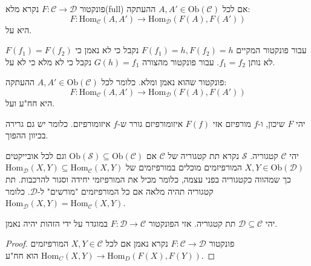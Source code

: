\documentclass{tstextbook}
\begin{document}
\begin{definition}
פונקטור \(F:\mathcal{C}\to \mathcal{D}\) נקרא מלא(full) אם לכל \(A,A' \in \mathrm{Ob}(\mathcal{C})\) ההעתקה:
$$F:\mathrm{Hom}_{\mathcal{C}}(A,A')\to \mathrm{Hom}_{\mathcal{D} }(F(A),F(A'))$$
היא על.

\end{definition}
\begin{example}
\end{example}
עבור פונקטור המקיים \(F(f_{1})=h,F(f_{2})=h\) נקבל כי לא נאמן כי \(F(f_{1})=F(f_{2})\) לא נותן \(f_{1}=f_{2}\). עבור פונקטור מהצורה \(G(h)=f_{1}\) נקבל כי לא מלא כי לא על.

\begin{definition}[שיכון]
פונקטור שהוא נאמן ומלא. כלומר לכל \(A,A' \in \mathrm{Ob}(\mathcal{C})\) ההעתקה:
$$F:\mathrm{Hom}_{\mathcal{C}}(A,A')\to \mathrm{Hom}_{\mathcal{D} }(F(A),F(A'))$$
היא חח"ע ועל.

\end{definition}
\begin{proposition}
יהי \(F\) שיכון, ו-\(f\) מורפיזם אזי \(F(f)\) איזומורפיזם גורר ש-\(f\) איזומורפיזם. כלומר יש גם גרירה בכיוון ההפוך.

\end{proposition}
\begin{reminder}[תת קטגוריה]
יהי \(\mathcal{C}\) קטגוריה. \(\mathcal{S}\) נקרא תת קטגוריה של \(\mathcal{C}\) אם \(\mathrm{Ob}(\mathcal{S})\subseteq \mathrm{Ob}(\mathcal{C})\) וגם לכל אובייקטים \(X,Y \in \mathrm{Ob}(\mathcal{D})\) המורפיזמים מוכלים במורפיזמים של \(\mathrm{Hom}_{\mathcal{D}}(X,Y)\subseteq \mathrm{Hom}_{\mathcal{C}}(X,Y)\) כך שמהווה כקטגוריה בפני עצמה, כלומר מכיל את המורפיזמי יחידה וסגור להרכבות. תת קטגוריה תהיה מלאה אם כל המורפיזמים "מורשים" ל-\(\mathcal{D}\). כלומר \(\mathrm{Hom}_{\mathcal{D}}(X,Y)= \mathrm{Hom}_{\mathcal{C}}(X,Y)\).

\end{reminder}
\begin{proposition}
יהי \(\mathcal{D}\subseteq \mathcal{C}\) תת קטגוריה. אזי הפונקטור \(F:\mathcal{D}\to \mathcal{C}\) במוגדר על ידי הזהות יהיה נאמן.

\end{proposition}
\begin{proof}
פונקטור \(F:\mathcal{C}\to \mathcal{D}\) נקרא נאמן אם לכל \(X,Y \in \mathcal{C}\) המורפיזמים \(\mathrm{Hom}_C(X, Y) \to \mathrm{Hom}_D(F(X), F(Y))\) הוא חח"ע. 

\end{proof}
\end{document}
